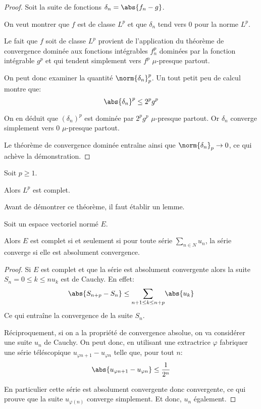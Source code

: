 \begin{proof}
Soit la suite de fonctions $\delta_n = \abs{f_n-g}$. 

On veut montrer que $f$ est de classe $L^p$ et que $\delta_n$ tend vers $0$ pour la norme $L^p$.

Le fait que $f$ soit de classe $L^p$ provient de l'application du théorème de convergence dominée aux fonctions intégrables $f_n^p$ dominées par la fonction intégrable $g^p$ et qui tendent simplement vers $f^p$ $\mu$-presque partout.

On peut donc examiner la quantité $\norm{\delta_n}_p^p$. Un tout petit peu de calcul montre que:
\[
\abs{\delta_n}^p \leq 2^p g^p
\]

On en déduit que $(\delta_n)^p$ est dominée par $2^p g^p$ $\mu$-presque partout. Or $\delta_n$ converge simplement vers $0$ $\mu$-presque partout.

Le théorème de convergence dominée entraîne ainsi que $\norm{\delta_n}_p \to 0$, ce qui achève la démonstration.
\end{proof}

\begin{theo}
Soit $p \geq 1$.

Alors $L^p$ est complet.
\end{theo}

Avant de démontrer ce théorème, il faut établir un lemme.

\begin{lem}
Soit un espace vectoriel normé $E$.

Alors $E$ est complet si et seulement si pour toute série $\displaystyle{\sum \limits_{n \in N}} u_n$, la série converge si elle est absolument convergence.
\end{lem}

\begin{proof}
Si $E$ est complet et que la série est absolument convergente alors la suite $S_n = \displaystyle{0 \leq k \leq n} u_k$ est de Cauchy. En effet:
\[
\abs{S_{n+p}-S_n} \leq \displaystyle{\sum \limits_{n+1 \leq k \leq n+p}} \abs{u_k}
\]
Ce qui entraîne la convergence de la suite $S_n$.

Réciproquement, si on a la propriété de convergence absolue, on va considérer une suite $u_n$ de Cauchy. On peut donc, en utilisant une extractrice $\varphi$ fabriquer une série téléscopique $u_{\varphi{n+1}} - u_{\varphi{n}}$ telle que, pour tout $n$:
\[
\abs{u_{\varphi{n+1}} - u_{\varphi{n}}} \leq \dfrac{1}{2^{n}}
\]

En particulier cette série est absolument convergente donc convergente, ce qui prouve que la suite $u_{\varphi(n)}$ converge simplement. Et donc, $u_n$ également.
\end{proof}

